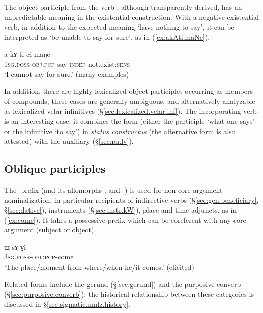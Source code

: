 The object participle  from the verb , although transparently derived, has an unpredictable meaning in the existential construction. With a negative existential verb, in addition to the expected meaning `have nothing to say', it can be interpreted as `be unable to say for sure', as in (\ref{ex:akAti.maNe}).

  \begin{exe}
\ex \label{ex:akAti.maNe}
\gll    a-kɤ-ti ci maŋe \\
 \textsc{1sg}.\textsc{poss}-\textsc{obj}:\textsc{pcp}-say \textsc{indef} not.exist:\textsc{sens} \\
 \glt `I cannot say for sure.' (many examples)
  \end{exe}
  
 
In addition, there are highly lexicalized object participles occurring as members of compounds; these cases are generally ambiguous, and alternatively analyzable as  lexicalized velar infinitives (§\ref{sec:lexicalized.velar.inf}). The incorporating verb  is an interesting case: it combines the form  (either the participle `what one says' or the infinitive `to say') in \textit{status constructus}  (the alternative form  is also attested) with the auxiliary  (§\ref{sec:pa.lv}).
 
\subsection{Oblique participles} \label{sec:oblique.participle}
The -prefix (and its allomorphs ,  and -) is used for non-core argument nominalization, in particular recipients of indirective verbs (§\ref{sec:gen.beneficiary}, §\ref{sec:dative}), instruments (§\ref{sec:instr.kW}), place and time adjuncts, as in (\ref{ex:come}). It takes a possessive prefix which can be coreferent with any core argument (subject or object).

\begin{exe}
\ex \label{ex:come}
\gll ɯ-sɤ-ɣi \\
 \textsc{3sg}.\textsc{poss}-\textsc{obl}:\textsc{pcp}-come \\
\glt  `The place/moment from where/when he/it comes.' (elicited)
\end{exe}

Related forms include the gerund (§\ref{sec:gerund}) and the purposive converb (§\ref{sec:purposive.converb}); the historical relationship between these categories is discussed in §\ref{sec:sigmatic.nmlz.history}.
 
